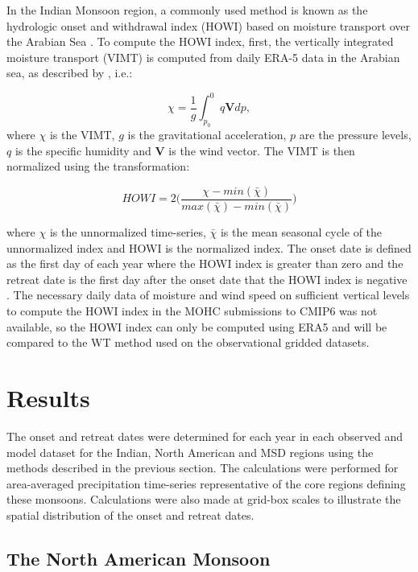 In the Indian Monsoon region, a commonly used method is known as the hydrologic onset and withdrawal index (HOWI)  based on moisture transport over the Arabian Sea \citep{fasullo2003,Sahana_2015,chevuturi2019}.
To compute the HOWI index, first, the vertically integrated moisture transport (VIMT) is computed from daily ERA-5 data in the Arabian sea, as described by \cite{fasullo2003}, i.e.:

\begin{equation}
\chi=\frac{1}{g}\int_{p_0}^0 q \mathbf{V} dp,
\end{equation}
 \noindent where $\chi$ is the VIMT, $g$ is the gravitational acceleration, $p$ are the pressure levels, $q$ is the specific humidity and $\mathbf{V}$ is the wind vector. The VIMT is then normalized using the transformation:

 \begin{equation}
 HOWI = 2 \bigg(\frac{\chi - min(\bar{\chi})}{max(\bar{\chi})-min(\bar{\chi})} \bigg)
 \end{equation}

 \noindent where $\chi$ is the unnormalized time-series, $\bar{\chi}$ is the mean seasonal cycle of the unnormalized index and HOWI is the normalized index. The onset date is defined as the first day of each year where the HOWI index is greater than zero and the retreat date is the first day after the onset date that the HOWI index is negative \citep{fasullo2003,Sahana_2015}.
 The necessary daily data of moisture and wind speed on sufficient vertical levels to compute the HOWI index in the MOHC submissions to CMIP6 was not available, so the HOWI index can only be computed using ERA5 and will be compared to the WT method used on the observational gridded datasets.

\section{Results}

The onset and retreat dates were determined for each year in each observed and model dataset for the Indian, North American and MSD regions using the methods described in the previous section. The calculations were performed for area-averaged precipitation time-series representative of the core regions defining these monsoons. Calculations were also made at grid-box scales to illustrate the spatial distribution of the onset and retreat dates. 
\subsection{The North American Monsoon}

